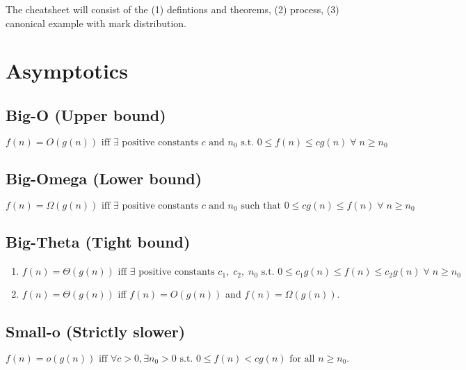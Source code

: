 \documentclass{article}
\begin{document}
The cheatsheet will consist of the (1) defintions and theorems, (2) process, (3) canonical example with mark distribution. 

\section{Asymptotics}

\subsection{Big-O (Upper bound)}
\begin{definition}
    $ f(n) = O(g(n)) \text{ iff } \exists \text{ positive constants } c \text{ and } n_0 \text{ s.t. } 0 \leq f(n) \leq c g(n) \; \forall \; n \geq n_0 $
\end{definition}

\subsection{Big-Omega (Lower bound)}
\begin{definition}
    $ f(n) = \Omega(g(n)) \text{ iff } \exists \text{ positive constants } c \text{ and } n_0 \text{ such that } 0 \leq c g(n) \leq f(n) \; \forall \; n \geq n_0 $
\end{definition}

\subsection{Big-Theta (Tight bound)}
\begin{definition}
    \begin{enumerate}
        \item $ f(n) = \Theta(g(n)) \text{ iff } \exists \text{ positive constants } c_1, \; c_2, \; n_0 \text{ s.t. } 0 \leq c_1 g(n) \leq f(n) \leq c_2 g(n) \; \forall \; n \geq n_0 $
        \item $f(n) = \Theta(g(n))$ iff $f(n) = O(g(n))$ and $f(n)=\Omega(g(n))$.
    \end{enumerate}
\end{definition}

\subsection{Small-o (Strictly slower)}
\begin{definition}
    $f(n) = o(g(n)) \text{ iff } \forall c > 0, \exists n_0 > 0 \text{ s.t. } 0 \leq f(n) < c g(n) \text{ for all } n \geq n_0.$
\end{definition}
\end{document}
